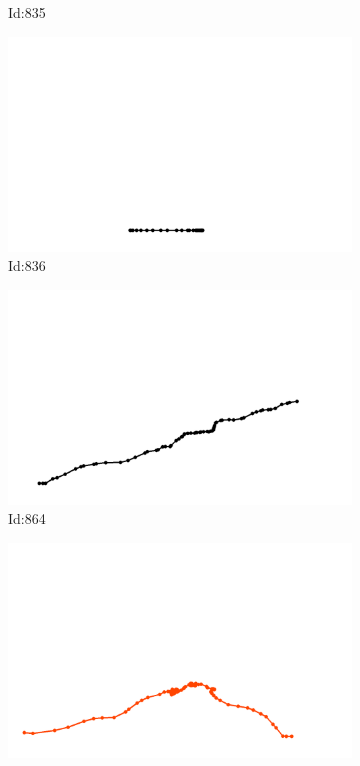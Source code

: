 \documentclass[12pt,twoside]{report}
\begin{document}
\begin{figure}
\begin{subfigure}[b]{0.20\textwidth}
\caption{Id:835}
\end{subfigure}
\begin{subfigure}[b]{0.20\textwidth}
\centering
\includegraphics[width=\textwidth]{../trajectories/836.png}
\caption{Id:836}
\end{subfigure}
\begin{subfigure}[b]{0.20\textwidth}
\centering
\includegraphics[width=\textwidth]{../trajectories/864.png}
\caption{Id:864}
\end{subfigure}
\begin{subfigure}[b]{0.20\textwidth}
\centering
\includegraphics[width=\textwidth]{../trajectories/905.png}

\end{subfigure}
\end{figure}
\end{document}
